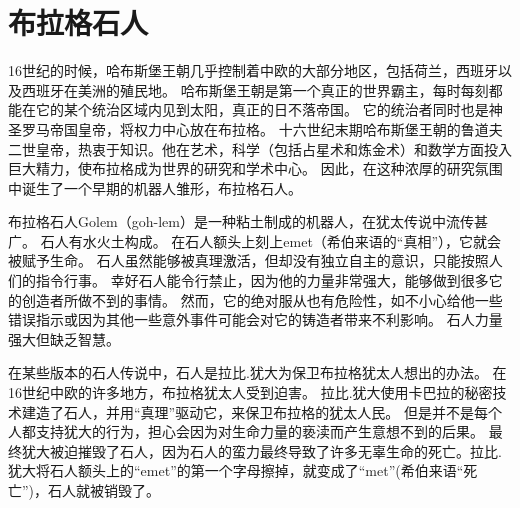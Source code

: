 
\chapter{布拉格石人}
16世纪的时候，哈布斯堡王朝几乎控制着中欧的大部分地区，包括荷兰，西班牙以及西班牙在美洲的殖民地。
哈布斯堡王朝是第一个真正的世界霸主，每时每刻都能在它的某个统治区域内见到太阳，真正的日不落帝国。
它的统治者同时也是神圣罗马帝国皇帝，将权力中心放在布拉格。
十六世纪末期哈布斯堡王朝的鲁道夫二世皇帝，热衷于知识。他在艺术，科学（包括占星术和炼金术）和数学方面投入巨大精力，使布拉格成为世界的研究和学术中心。
因此，在这种浓厚的研究氛围中诞生了一个早期的机器人雏形，布拉格石人。

布拉格石人Golem（goh-lem）是一种粘土制成的机器人，在犹太传说中流传甚广。
石人有水火土构成。
在石人额头上刻上emet（希伯来语的“真相”），它就会被赋予生命。
石人虽然能够被真理激活，但却没有独立自主的意识，只能按照人们的指令行事。
幸好石人能令行禁止，因为他的力量非常强大，能够做到很多它的创造者所做不到的事情。
然而，它的绝对服从也有危险性，如不小心给他一些错误指示或因为其他一些意外事件可能会对它的铸造者带来不利影响。
石人力量强大但缺乏智慧。


在某些版本的石人传说中，石人是拉比.犹大为保卫布拉格犹太人想出的办法。
在16世纪中欧的许多地方，布拉格犹太人受到迫害。
拉比.犹大使用卡巴拉的秘密技术建造了石人，并用“真理”驱动它，来保卫布拉格的犹太人民。
但是并不是每个人都支持犹大的行为，担心会因为对生命力量的亵渎而产生意想不到的后果。
最终犹大被迫摧毁了石人，因为石人的蛮力最终导致了许多无辜生命的死亡。拉比.犹大将石人额头上的“emet”的第一个字母擦掉，就变成了“met”(希伯来语“死亡”)，石人就被销毁了。


